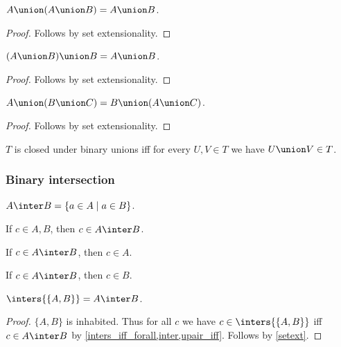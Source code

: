 \begin{proposition}\label{union_absorb_left}
    $A\union (A\union B) = A\union B$.
\end{proposition}
\begin{proof}
    Follows by set extensionality.
\end{proof}

\begin{proposition}\label{union_absorb_right}
    $(A\union B)\union B = A\union B$.
\end{proposition}
\begin{proof}
    Follows by set extensionality.
\end{proof}

\begin{proposition}\label{union_comm_left}
    $A\union (B\union C) = B\union (A\union C)$.
\end{proposition}
\begin{proof}
    Follows by set extensionality.
\end{proof}

\begin{abbreviation}\label{closedunderunion}
    $T$ is closed under binary unions
    iff for every $U,V\in T$ we have $U\union V\in T$.
\end{abbreviation}


\subsubsection{Binary intersection}

\begin{definition}\label{inter}
    $A\inter B = \{ a \in A \mid a\in B\}$.
\end{definition}

\begin{proposition}\label{inter_intro}
    If $c\in A, B$, then $c\in A\inter B$.
\end{proposition}

\begin{proposition}\label{inter_elim_left}
    If $c\in A\inter B$, then $c\in A$.
\end{proposition}

\begin{proposition}\label{inter_elim_right}
    If $c\in A\inter B$, then $c\in B$.
\end{proposition}

\begin{proposition}\label{inter_as_inters}
    $\inters{\{A,B\}} = A\inter B$.
\end{proposition}
\begin{proof}
    $\{A,B\}$ is inhabited.
    Thus for all $c$ we have $c\in\inters{\{A,B\}}$ iff $c\in A\inter B$
        by \cref{inters_iff_forall,inter,upair_iff}.
    Follows by \cref{setext}.  
\end{proof}


